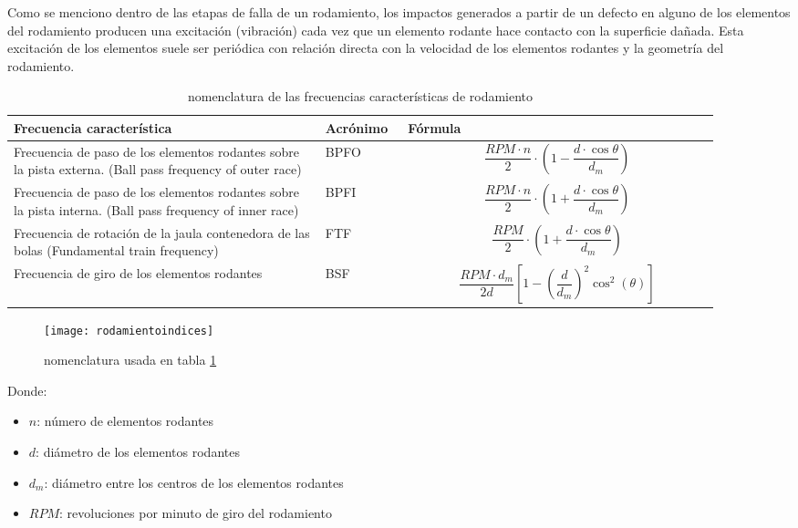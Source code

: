  			Como se menciono dentro de las etapas de falla de un rodamiento, los impactos generados a partir de un defecto en alguno de los elementos del rodamiento producen una excitación (vibración) cada vez que un elemento rodante hace contacto con la superficie dañada. Esta excitación de los elementos suele ser periódica con relación directa con la velocidad de los elementos rodantes y la geometría del rodamiento.
 			
 			\begin{center}
 				\begin{table}
 					\caption{nomenclatura de las frecuencias características de rodamiento}
 					\label{tab:frecuenciasrodamiento}
 					\begin{tabular}{| >{\centering\arraybackslash}m{0.4\linewidth} | >{\centering\arraybackslash}m{0.1\linewidth} |>{\centering\arraybackslash}m{0.4\linewidth}| } 		
 						\hline
 						Frecuencia característica & \scriptsize{Acrónimo} & Fórmula \\ \hline \hline
 						Frecuencia de paso de los elementos rodantes sobre la pista externa.
 						(Ball pass frequency of outer race) & BPFO & $$\frac{RPM\cdot n}{2}\cdot \left (1-\frac{d\cdot\cos{\theta}}{d_{m}}\right )$$ \\ \hline
 						Frecuencia de paso de los elementos rodantes sobre la pista interna.
 						(Ball pass frequency of inner race) & BPFI & $$\frac{RPM\cdot n}{2}\cdot\left (1+\frac{d\cdot\cos{\theta}}{d_{m}}\right )$$ \\ \hline
 						Frecuencia de rotación de la jaula contenedora de las bolas (Fundamental train frequency) & FTF & $$\frac{RPM}{2}\cdot \left (1+\frac{d\cdot\cos{\theta}}{d_{m}}\right )$$ \\ \hline
 						Frecuencia de giro de los elementos rodantes & BSF & $$\frac{RPM \cdot  d_{m}}{2d}\left[1-\left(\frac{d}{d_{m}}\right)^2 \cos^2(\theta)\right]$$ \\ \hline
 					\end{tabular}
 				\end{table}					
 			\end{center}
 		    \begin{figure}
 			    \centering
 			    \texttt{[image: rodamientoindices]}
			    \caption{nomenclatura usada en tabla \ref{tab:frecuenciasrodamiento}}
 			    \label{fig:rodamientopartes}
 		    \end{figure}
 		    Donde:
     		\begin{itemize}
     			\item $n$: número de elementos rodantes
     			\item $d$: diámetro de los elementos rodantes
     			\item $d_{m}$: diámetro entre los centros de los elementos rodantes
     			\item $RPM$: revoluciones por minuto de giro del rodamiento
     		\end{itemize}

